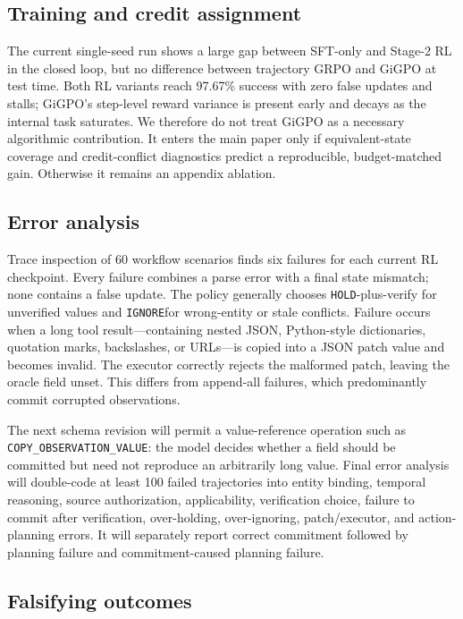 \documentclass{article}
\newcommand{\hold}{\texttt{HOLD}}
\newcommand{\ignore}{\texttt{IGNORE}}
\begin{document}
\subsection{Training and credit assignment}

The current single-seed run shows a large gap between SFT-only and Stage-2 RL in the closed loop, but no difference between trajectory GRPO and GiGPO at test time. Both RL variants reach 97.67\% success with zero false updates and stalls; GiGPO's step-level reward variance is present early and decays as the internal task saturates. We therefore do not treat GiGPO as a necessary algorithmic contribution. It enters the main paper only if equivalent-state coverage and credit-conflict diagnostics predict a reproducible, budget-matched gain. Otherwise it remains an appendix ablation.

\subsection{Error analysis}

Trace inspection of 60 workflow scenarios finds six failures for each current RL checkpoint. Every failure combines a parse error with a final state mismatch; none contains a false update. The policy generally chooses \hold-plus-verify for unverified values and \ignore for wrong-entity or stale conflicts. Failure occurs when a long tool result---containing nested JSON, Python-style dictionaries, quotation marks, backslashes, or URLs---is copied into a JSON patch value and becomes invalid. The executor correctly rejects the malformed patch, leaving the oracle field unset. This differs from append-all failures, which predominantly commit corrupted observations.

The next schema revision will permit a value-reference operation such as \texttt{COPY\_OBSERVATION\_VALUE}: the model decides whether a field should be committed but need not reproduce an arbitrarily long value. Final error analysis will double-code at least 100 failed trajectories into entity binding, temporal reasoning, source authorization, applicability, verification choice, failure to commit after verification, over-holding, over-ignoring, patch/executor, and action-planning errors. It will separately report correct commitment followed by planning failure and commitment-caused planning failure.

\subsection{Falsifying outcomes}
\end{document}
